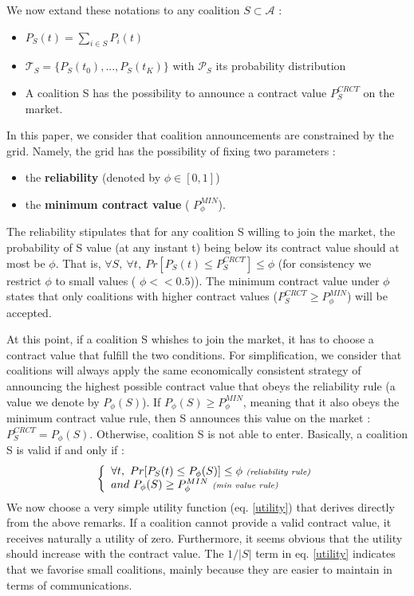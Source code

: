 \documentclass[conference]{IEEEtran}
\begin{document}
We now extand these notations to any coalition $ S \subset \mathcal{A} $ : 
\begin{itemize}
\item $ P_{S}(t) = \sum_{i \in S} P_{i}(t) $
\item $ \mathcal{T}_{S} = \{ P_{S}(t_{0}),...,P_{S}(t_{K}) \} $ with $ \mathcal{P}_{S} $ its probability distribution
\item A coalition S has the possibility to announce a contract value $ P_{S}^{CRCT} $ on the market.
\end{itemize}

In this paper, we consider that coalition announcements are constrained by the grid. Namely, the grid has the possibility of fixing two parameters : 

\begin{itemize}
\item the \textbf{reliability} (denoted by $ \phi \in [0,1] $)
\item the \textbf{minimum contract value} ( $ P_{\phi}^{MIN} $). 
\end{itemize}

The reliability stipulates that for any coalition S willing to join the market, the probability of S value (at any instant t) being below its contract value should at most be $ \phi $. That is, $ \forall S,\ \forall t,\ Pr[P_{S}(t) \leq P_{S}^{CRCT} ] \leq \phi $ (for consistency we restrict $ \phi $ to small values ( $ \phi << 0.5 $)). The minimum contract value under $ \phi $ states that only coalitions with higher contract values ($ P_{S}^{CRCT} \geq P_{\phi}^{MIN} $) will be accepted.

At this point, if a coalition S whishes to join the market, it has to choose a contract value that fulfill the two conditions. For simplification, we consider that coalitions will always apply the same economically consistent strategy of announcing the highest possible contract value that obeys the reliability rule (a value we denote by $ P_{\phi}(S) $). If $ P_{\phi}(S) \geq P_{\phi}^{MIN} $, meaning that it also obeys the minimum contract value rule, then S announces this value on the market : $ P_{S}^{CRCT} = P_{\phi}(S) $. Otherwise, coalition S is not able to enter.
Basically, a coalition S is valid if and only if :
\begin{equation}
\left\{ \begin{array}{lll}
		\forall t,\ Pr[ P_{S}(t) \leq P_{\phi}(S)] \leq \phi\ \textit{{\scriptsize (reliability rule)}} \\
		and\ P_{\phi}(S) \geq P_{\phi}^{MIN}\ \textit{{\scriptsize (min value rule)}}

\end{array} \right. 
\label{rules}
\end{equation}
We now choose a very simple utility function (eq. \ref{utility}) that derives directly from the above remarks. If a coalition cannot provide a valid contract value, it receives naturally a utility of zero. Furthermore, it seems obvious that the utility should increase with the contract value. The $ 1/|S| $ term in eq. \ref{utility} indicates that we favorise small coalitions, mainly because they are easier to maintain in terms of communications.
\end{document}

